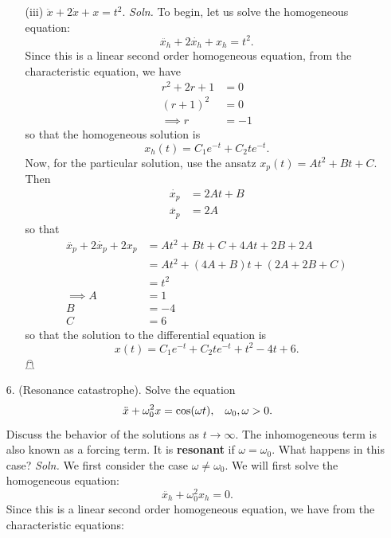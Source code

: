 \documentclass{article}
\begin{document}
\begin{itemize}
\begin{itemize}
        \item[(iii)] $\ddot{x} + 2\dot{x} + x = t^2$.
        \newline\newline
        \textit{Soln.} To begin, let us solve the homogeneous equation:
        \[\ddot{x_h} + 2\dot{x_h} + x_h = t^2.\]
        Since this is a linear second order homogeneous equation, from the characteristic equation, we have
        \begin{align*}
            r^2 + 2r + 1 &= 0\\
            (r + 1)^2 &= 0\\
            \implies r &= -1
        \end{align*}
        so that the homogeneous solution is
        \[x_h(t) = C_1e^{-t} + C_2te^{-t}.\]
        Now, for the particular solution, use the ansatz $x_p(t) = At^2 + Bt + C$. Then
        \begin{align*}
            \dot{x_p} &= 2At + B\\
            \ddot{x_p} &= 2A
        \end{align*}
        so that 
        \begin{align*}
            \ddot{x_p} + 2\dot{x_p} + 2x_p &= At^2 + Bt + C + 4At + 2B + 2A\\
            &= At^2 + (4A + B)t + (2A + 2B + C)\\
            &= t^2\\
            \implies A &= 1\\
            B &= -4\\
            C &= 6
        \end{align*}
        so that the solution to the differential equation is
        \[x(t) = C_1e^{-t} + C_2te^{-t} + t^2 - 4t + 6.\]
        \hfill $\mathghost$
    \end{itemize}   
    \pagebreak
    \item[6.] (Resonance catastrophe). Solve the equation
    \[\ddot{x} + \omega_0^2x = \cos(\omega t), \hspace{0.3cm} \omega_0, \omega > 0.\]
    Discuss the behavior of the solutions as $t \to \infty$. The inhomogeneous term is also known as a forcing term. It is \textbf{resonant} if $\omega = \omega_0$. What happens in this case?
    \newline\newline
    \textit{Soln.} We first consider the case $\omega \neq \omega_0$. We will first solve the homogeneous equation:
    \[\ddot{x_h} + \omega_0^2x_h = 0.\]
    Since this is a linear second order homogeneous equation, we have from the characteristic equations:

\end{itemize}
\end{document}
